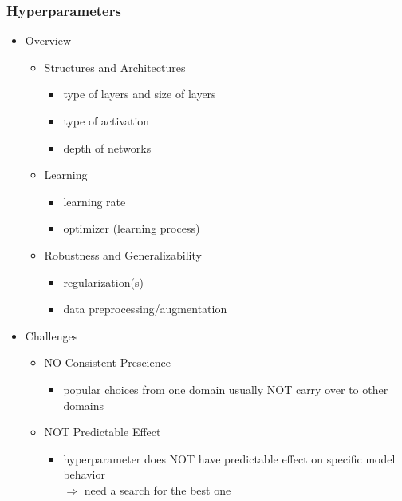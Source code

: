 \subsubsection{Hyperparameters}
\begin{itemize}
\item Overview
	\begin{itemize}
	\item Structures and Architectures
		\begin{itemize}
		\item type of layers and size of layers
		\item type of activation
		\item depth of networks
		\end{itemize}
	\item Learning
		\begin{itemize}
		\item learning rate
		\item optimizer (learning process)
		\end{itemize}
	\item Robustness and Generalizability
		\begin{itemize}
		\item regularization(s)
		\item data preprocessing/augmentation
		\end{itemize}
	\end{itemize}
\item Challenges
	\begin{itemize}
	\item NO Consistent Prescience
		\begin{itemize}
		\item popular choices from one domain usually NOT carry over to other domains
		\end{itemize}
	\item NOT Predictable Effect
		\begin{itemize}
		\item hyperparameter does NOT have predictable effect on specific model behavior \\
		$\Rightarrow$ need a search for the best one
		\end{itemize}
	\end{itemize}
\end{itemize}

